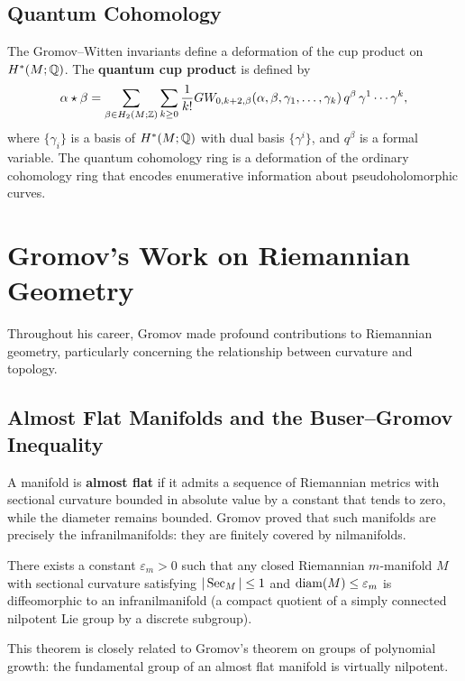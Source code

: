 \subsection{Quantum Cohomology}

The Gromov--Witten invariants define a deformation of the cup product on \(H^*(M; \mathbb{Q})\). The \textbf{quantum cup product} is defined by
\[
\alpha \star \beta = \sum_{\beta \in H_2(M; \mathbb{Z})} \sum_{k \geq 0} \frac{1}{k!} GW_{0, k+2, \beta}(\alpha, \beta, \gamma_1, \dots, \gamma_k) \, q^\beta \, \gamma^1 \cdots \gamma^k,
\]
where \(\{\gamma_i\}\) is a basis of \(H^*(M; \mathbb{Q})\) with dual basis \(\{\gamma^i\}\), and \(q^\beta\) is a formal variable. The quantum cohomology ring is a deformation of the ordinary cohomology ring that encodes enumerative information about pseudoholomorphic curves.

\section{Gromov's Work on Riemannian Geometry}

Throughout his career, Gromov made profound contributions to Riemannian geometry, particularly concerning the relationship between curvature and topology.

\subsection{Almost Flat Manifolds and the Buser--Gromov Inequality}

A manifold is \textbf{almost flat} if it admits a sequence of Riemannian metrics with sectional curvature bounded in absolute value by a constant that tends to zero, while the diameter remains bounded. Gromov proved that such manifolds are precisely the infranilmanifolds: they are finitely covered by nilmanifolds.

\begin{theorem}[Gromov, 1978]
There exists a constant \(\varepsilon_m > 0\) such that any closed Riemannian \(m\)-manifold \(M\) with sectional curvature satisfying \(|\operatorname{Sec}_M| \leq 1\) and \(\operatorname{diam}(M) \leq \varepsilon_m\) is diffeomorphic to an infranilmanifold (a compact quotient of a simply connected nilpotent Lie group by a discrete subgroup).
\end{theorem}

This theorem is closely related to Gromov's theorem on groups of polynomial growth: the fundamental group of an almost flat manifold is virtually nilpotent.

